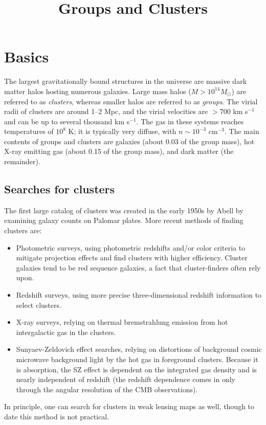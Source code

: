 \title{\bf Groups and Clusters}

\section{Basics}

The largest gravitationally bound structures in the universe are
massive dark matter halos hosting numerous galaxies. Large mass halos
($M > 10^{14} M_\odot$) are referred to as {\it clusters}, whereas
smaller halos are referred to as {\it groups}. The virial radii of
clusters are around 1--2 Mpc, and the virial velocities are $>700$ km
s$^{-1}$ and can be up to several thousand km s$^{-1}$. The gas in
these systems reaches temperatures of $10^8$ K; it is typically very
diffuse, with $n\sim 10^{-3}$ cm$^{-3}$. The main contents of groups
and clusters are galaxies (about 0.03 of the group mass), hot X-ray
emitting gas (about 0.15 of the group mass), and dark matter (the
remainder).

\subsection{Searches for clusters}

The first large catalog of clusters was created in the early 1950s by
Abell by examining galaxy counts on Palomar plates. More recent
methods of finding clusters are:
\begin{itemize}
\item Photometric surveys, using photometric redshifts and/or color
criteria to mitigate projection effects and find clusters with higher
efficiency. Cluster galaxies tend to be red sequence galaxies, a fact
that cluster-finders often rely upon.
\item Redshift surveys, using more precise three-dimensional redshift
information to select clusters. 
\item X-ray surveys, relying on thermal bremstrahlung emission from
hot intergalactic gas in the clusters.
\item Sunyaev-Zeldovich effect searches, relying on distortions of
background cosmic microwave background light by the hot gas in
foreground clusters. Because it is absorption, the SZ effect is
dependent on the integrated gas density and is nearly independent of
redshift (the redshift dependence comes in only through the angular
resolution of the CMB observations).
\end{itemize}
In principle, one can search for clusters in weak lensing maps as
well, though to date this method is not practical.

